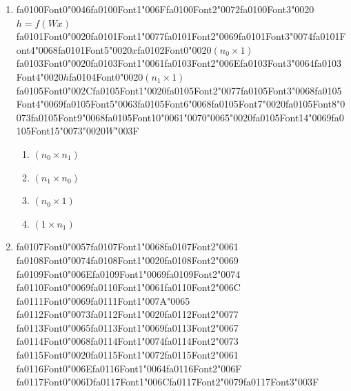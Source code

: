 \documentclass[12pt]{article}
\begin{document}
\begin{enumerate}[label=Q\arabic*.]
\item {\csname fa0100Font0\endcsname\char"0046}{\csname fa0100Font1\endcsname\char"006F}{\csname fa0100Font2\endcsname\char"0072}{\csname fa0100Font3\endcsname\char"0020}$h = f(Wx)${\csname fa0101Font0\endcsname\char"0020}{\csname fa0101Font1\endcsname\char"0077}{\csname fa0101Font2\endcsname\char"0069}{\csname fa0101Font3\endcsname\char"0074}{\csname fa0101Font4\endcsname\char"0068}{\csname fa0101Font5\endcsname\char"0020}$x${\csname fa0102Font0\endcsname\char"0020}$(n_0 \times 1)${\csname fa0103Font0\endcsname\char"0020}{\csname fa0103Font1\endcsname\char"0061}{\csname fa0103Font2\endcsname\char"006E}{\csname fa0103Font3\endcsname\char"0064}{\csname fa0103Font4\endcsname\char"0020}$h${\csname fa0104Font0\endcsname\char"0020}$(n_1 \times 1)${\csname fa0105Font0\endcsname\char"002C}{\csname fa0105Font1\endcsname\char"0020}{\csname fa0105Font2\endcsname\char"0077}{\csname fa0105Font3\endcsname\char"0068}{\csname fa0105Font4\endcsname\char"0069}{\csname fa0105Font5\endcsname\char"0063}{\csname fa0105Font6\endcsname\char"0068}{\csname fa0105Font7\endcsname\char"0020}{\csname fa0105Font8\endcsname\char"0073}{\csname fa0105Font9\endcsname\char"0068}{\csname fa0105Font10\endcsname\char"0061}{\char"0070}{\char"0065}{\char"0020}{\csname fa0105Font14\endcsname\char"0069}{\csname fa0105Font15\endcsname\char"0073}{\char"0020}$W${\char"003F}
\begin{enumerate}[label=(\Alph*)]
    \item $(n_0 \times n_1)$
    \item $(n_1 \times n_0)$
    \item $(n_0 \times 1)$
    \item $(1 \times n_1)$
\end{enumerate}
\item {\csname fa0107Font0\endcsname\char"0057}{\csname fa0107Font1\endcsname\char"0068}{\csname fa0107Font2\endcsname\char"0061} {\csname fa0108Font0\endcsname\char"0074}{\csname fa0108Font1\endcsname\char"0020}{\csname fa0108Font2\endcsname\char"0069} {\csname fa0109Font0\endcsname\char"006E}{\csname fa0109Font1\endcsname\char"0069}{\csname fa0109Font2\endcsname\char"0074} {\csname fa0110Font0\endcsname\char"0069}{\csname fa0110Font1\endcsname\char"0061}{\csname fa0110Font2\endcsname\char"006C} {\csname fa0111Font0\endcsname\char"0069}{\csname fa0111Font1\endcsname\char"007A}{\char"0065} {\csname fa0112Font0\endcsname\char"0073}{\csname fa0112Font1\endcsname\char"0020}{\csname fa0112Font2\endcsname\char"0077} {\csname fa0113Font0\endcsname\char"0065}{\csname fa0113Font1\endcsname\char"0069}{\csname fa0113Font2\endcsname\char"0067} {\csname fa0114Font0\endcsname\char"0068}{\csname fa0114Font1\endcsname\char"0074}{\csname fa0114Font2\endcsname\char"0073} {\csname fa0115Font0\endcsname\char"0020}{\csname fa0115Font1\endcsname\char"0072}{\csname fa0115Font2\endcsname\char"0061} {\csname fa0116Font0\endcsname\char"006E}{\csname fa0116Font1\endcsname\char"0064}{\csname fa0116Font2\endcsname\char"006F} {\csname fa0117Font0\endcsname\char"006D}{\csname fa0117Font1\endcsname\char"006C}{\csname fa0117Font2\endcsname\char"0079}{\csname fa0117Font3\endcsname\char"003F}

\end{enumerate}
\end{document}
